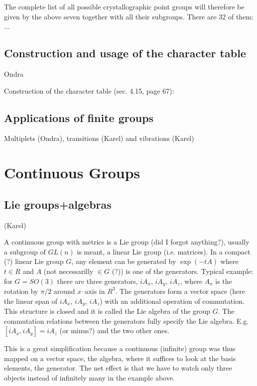The complete list of all possible crystallographic point groups will therefore
be given by the above seven together with all their subgroups. There are 32 of
them: ...

\section{Construction and usage of the character table}

Ondra

Construction of the character table \cite{elliott} (sec. 4.15, page 67):

\section{Applications of finite groups}

Multiplets (Ondra), transitions (Karel) and vibrations (Karel)




\chapter{Continuous Groups}

\section{Lie groups+algebras}

(Karel)

A continuous group with metrics is a Lie group (did I forgot anything?),
usually a subgroup of $GL(n)$ is meant, a linear Lie group (i.e. matrices). In
a compact (?) linear Lie group $G$, any element can be generated by
$\exp(-tA)$ where $t\in R$ and $A$ (not necessarilly $\in G$ (?)) is one of
the generators. Typical example: for $G=SO(3)$ there are three generators,
$iA_x$, $iA_y$, $iA_z$, where $A_x$ is the rotation by $\pi/2$ around
$x$--axis in $R^3$. The generators form a vector space (here the linear span
of $iA_x$, $iA_y$, $iA_z$) with an additional operation of
commutation. This structure is closed and it is called the Lie algebra of the
group $G$. The commutation relations between the generators fully specify the
Lie algebra. E.g. $[iA_x,iA_y]=iA_z$ (or minus?) and the two other ones.

This is a great simplification because a continuous (infinite) group was thus
mapped on a vector space, the algebra, where it suffices to look at the basis
elements, the generator. The net effect is that we have to watch only three
objects instead of infinitely many in the example above.



